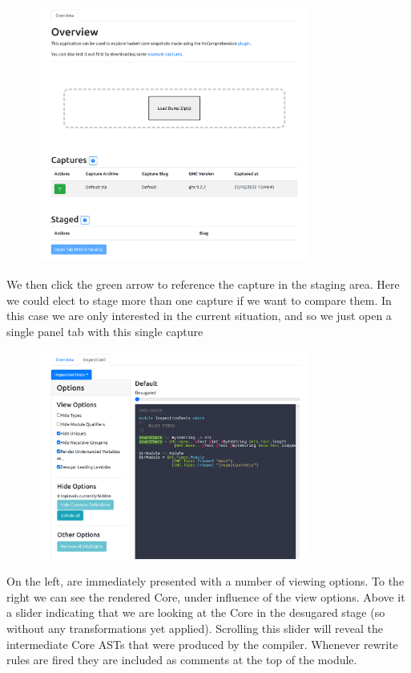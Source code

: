 \begin{figure}[H]
\centering
\includegraphics[width=0.8\textwidth]{figs/countchars_1.png}
\label{fig:countchars_1}
\end{figure}

We then click the green arrow to reference the capture in the staging area. Here we could elect to stage more
than one capture if we want to compare them. In this case we are only interested in the current situation, and so we
just open a single panel tab with this single capture


\begin{figure}[H]
\centering
\includegraphics[width=0.8\textwidth]{figs/countchars_2.png}
\label{fig:countchars_2}
\end{figure}

On the left, are immediately presented with a number of viewing options. To the right we can see the rendered
Core, under influence of the view options. Above it a slider indicating that we are looking at the
Core in the desugared stage (so without any transformations yet applied). Scrolling this slider will reveal
the intermediate Core ASTs that were produced by the compiler. Whenever rewrite rules are fired they are included
as comments at the top of the module.

